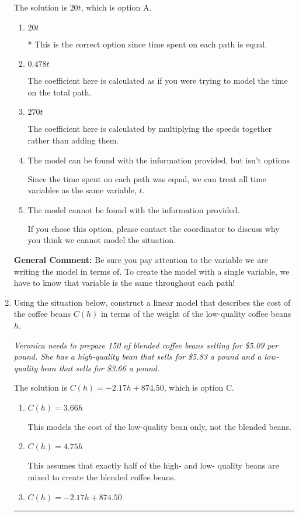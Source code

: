 \documentclass{extbook}[14pt]
\newcommand{\litem}[1]{\item #1

\rule{\textwidth}{0.4pt}}
\begin{document}
\begin{enumerate}
{The solution is \( 20 t \), which is option A.\begin{enumerate}[label=\Alph*.]
\item \( 20 t \)

* This is the correct option since time spent on each path is equal.
\item \( 0.478 t \)

The coefficient here is calculated as if you were trying to model the time on the total path.
\item \( 270 t \)

The coefficient here is calculated by multiplying the speeds together rather than adding them.
\item \( \text{The model can be found with the information provided, but isn't options 1-3.} \)

Since the time spent on each path was equal, we can treat all time variables as the same variable, $t$.
\item \( \text{The model cannot be found with the information provided.} \)

If you chose this option, please contact the coordinator to discuss why you think we cannot model the situation.
\end{enumerate}

\textbf{General Comment:} Be sure you pay attention to the variable we are writing the model in terms of. To create the model with a single variable, we have to know that variable is the same throughout each path!
}
\litem{
Using the situation below, construct a linear model that describes the cost of the coffee beans $C(h)$ in terms of the weight of the low-quality coffee beans $h$.

\begin{center}
    \textit{ Veronica needs to prepare 150 of blended coffee beans selling for \$5.09 per pound. She has a high-quality bean that sells for \$5.83 a pound and a low-quality bean that sells for \$3.66 a pound. }
\end{center}


The solution is \( C(h) = -2.17 h + 874.50 \), which is option C.\begin{enumerate}[label=\Alph*.]
\item \( C(h) = 3.66 h \)

This models the cost of the low-quality bean only, not the blended beans.
\item \( C(h) = 4.75 h \)

This assumes that exactly half of the high- and low- quality beans are mixed to create the blended coffee beans.
\item \( C(h) = -2.17 h + 874.50 \)


\end{enumerate}}
\end{enumerate}
\end{document}
